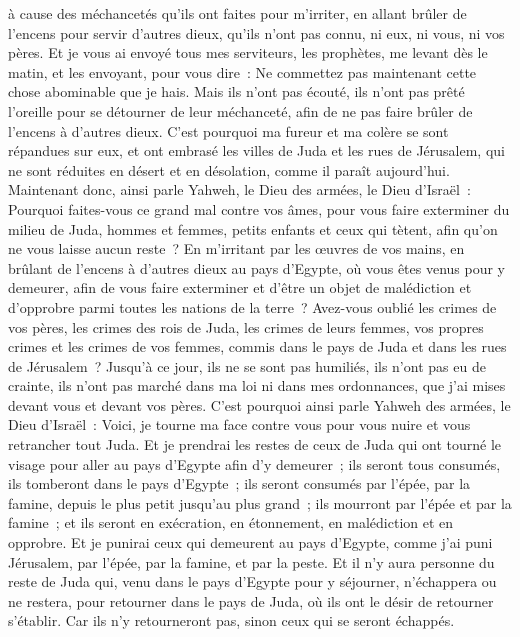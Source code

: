 \begin{multicols}{2}
à cause des méchancetés qu'ils ont faites pour m'irriter, en allant brûler de l'encens pour servir d'autres dieux, qu'ils n'ont pas connu, ni eux, ni vous, ni vos pères.
Et je vous ai envoyé tous mes serviteurs, les prophètes, me levant dès le matin, et les envoyant, pour vous dire~: Ne commettez pas maintenant cette chose abominable que je hais.
Mais ils n'ont pas écouté, ils n'ont pas prêté l'oreille pour se détourner de leur méchanceté, afin de ne pas faire brûler de l'encens à d'autres dieux.
C'est pourquoi ma fureur et ma colère se sont répandues sur eux, et ont embrasé les villes de Juda et les rues de Jérusalem, qui ne sont réduites en désert et en désolation, comme il paraît aujourd'hui.
Maintenant donc, ainsi parle Yahweh, le Dieu des armées, le Dieu d'Israël~: Pourquoi faites-vous ce grand mal contre vos âmes, pour vous faire exterminer du milieu de Juda, hommes et femmes, petits enfants et ceux qui tètent, afin qu'on ne vous laisse aucun reste~?
En m'irritant par les œuvres de vos mains, en brûlant de l'encens à d'autres dieux au pays d'Egypte, où vous êtes venus pour y demeurer, afin de vous faire exterminer et d'être un objet de malédiction et d'opprobre parmi toutes les nations de la terre~?
Avez-vous oublié les crimes de vos pères, les crimes des rois de Juda, les crimes de leurs femmes, vos propres crimes et les crimes de vos femmes, commis dans le pays de Juda et dans les rues de Jérusalem~?
Jusqu'à ce jour, ils ne se sont pas humiliés, ils n'ont pas eu de crainte, ils n'ont pas marché dans ma loi ni dans mes ordonnances, que j'ai mises devant vous et devant vos pères.
C'est pourquoi ainsi parle Yahweh des armées, le Dieu d'Israël~: Voici, je tourne ma face contre vous pour vous nuire et vous retrancher tout Juda.
Et je prendrai les restes de ceux de Juda qui ont tourné le visage pour aller au pays d'Egypte afin d'y demeurer~; ils seront tous consumés, ils tomberont dans le pays d'Egypte~; ils seront consumés par l'épée, par la famine, depuis le plus petit jusqu'au plus grand~; ils mourront par l'épée et par la famine~; et ils seront en exécration, en étonnement, en malédiction et en opprobre.
Et je punirai ceux qui demeurent au pays d'Egypte, comme j'ai puni Jérusalem, par l'épée, par la famine, et par la peste.
Et il n'y aura personne du reste de Juda qui, venu dans le pays d'Egypte pour y séjourner, n'échappera ou ne restera, pour retourner dans le pays de Juda, où ils ont le désir de retourner s'établir. Car ils n'y retourneront pas, sinon ceux qui se seront échappés.

\end{multicols}
